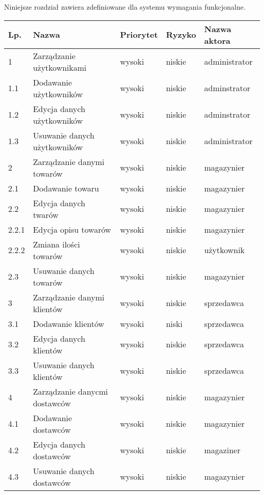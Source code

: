 Niniejsze rozdział zawiera zdefiniowane dla systemu wymagania funkcjonalne.


\begin{table}[ht]
	 \begin{center}
	    \begin{tabular}{| l | l | l | l | l |}%
	    	\hline
		    \textbf{Lp.} & \textbf{Nazwa}  & \textbf{Priorytet} & \textbf{Ryzyko} &
		    \textbf{Nazwa aktora} \\
		    \hline
		    1 & Zarządzanie użytkownikami & wysoki & niskie & administrator \\
		    1.1 & Dodawanie użytkowników & wysoki & niskie & adminstrator \\
		    1.2 & Edycja danych użytkowników & wysoki & niskie & adminstrator \\ 	
		    1.3 & Usuwanie danych użytkowników & wysoki &niskie & administrator \\
		    \hline
		    2 & Zarządzanie danymi towarów & wysoki & niskie & magazynier \\
		    2.1 & Dodawanie towaru & wysoki &  niskie & magazynier \\
		    2.2 & Edycja danych twarów & wysoki & niskie & magazynier \\
		    2.2.1 & Edycja opisu towarów & wysoki & niskie & magazynier \\
		    2.2.2 & Zmiana ilości towarów & wysoki & niskie & użytkownik \\
		    2.3 & Usuwanie danych towarów & wysoki & niskie & magazynier \\
		    \hline
		   	3 & Zarządzanie danymi klientów & wysoki & niskie & sprzedawca \\
		   	3.1 & Dodawanie klientów & wysoki & niski & sprzedawca \\
		   	3.2 & Edycja danych klientów & wysoki & niskie & sprzedawca \\
		   	3.3 & Usuwanie danych klientów & wysoki & niskie & sprzedawca \\
		   	\hline
		   	4 & Zarządzanie danycmi dostawców & wysoki & niskie & magazynier \\
		   	4.1 & Dodawanie dostawców & wysoki & niskie & magazynier \\
		   	4.2 & Edycja danych dostawców & wysoki & niskie & magaziner \\
		   	4.3 & Usuwanie danych dostawców & wysoki & niskie & magazynier \\

\end{tabular}
\end{center}
\end{table}
